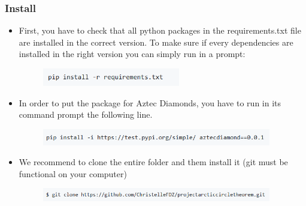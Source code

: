 \documentclass [xcolor=svgnames, t] {beamer}
\begin{document}
\begin{frame}

\frametitle{Install}

\begin{itemize}
    \item First, you have to check that all python packages in the requirements.txt file are installed in the correct version. To make sure if every dependencies are installed in the right version you can simply run in a prompt:
    \begin{figure}[!h]
    \begin{center}
   \includegraphics[width=6cm]{pipinstall.png}
   \end{center}
    \end{figure}
    \item In order to put the package for Aztec Diamonds, you have to run in its command prompt the following line.
    \begin{figure}[!h]
    \begin{center}
   \includegraphics[width=10cm]{pipinstall2.png}
   \end{center}
    \end{figure}
    \item We recommend to clone the entire folder and them install it (git must be functional on your computer)
    \begin{figure}[!h]
    \begin{center}
   \includegraphics[width=10cm]{pipinstall3.png}
   \end{center}
    \end{figure}
\end{itemize}
\end{frame}
\end{document}
